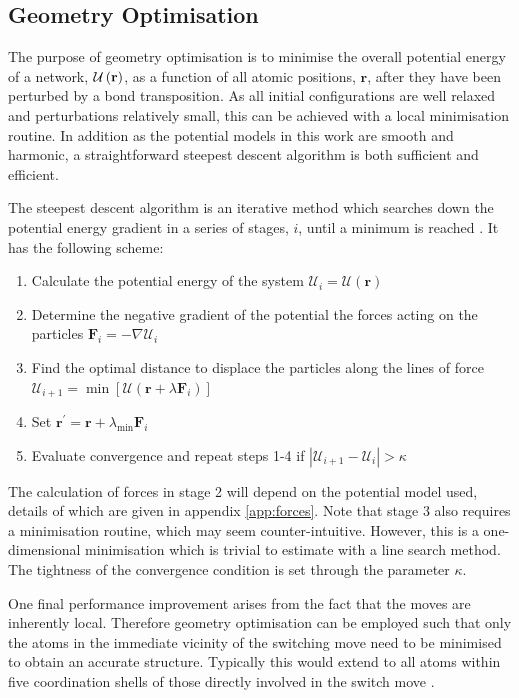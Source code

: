 \subsection{Geometry Optimisation}
\label{s:geomopt}

The purpose of geometry optimisation is to minimise the overall potential energy of a network, $\mathcal{U}\left(\mathbf{r}\right)$, as a function of all atomic positions, $\mathbf{r}$, after they have been perturbed \eg{} by a bond transposition.
As all initial configurations are well relaxed and perturbations relatively small, this can be achieved with a local minimisation routine.
In addition as the potential models in this work are smooth and harmonic, a straightforward steepest descent algorithm is both sufficient and efficient.

The steepest descent algorithm is an iterative method which searches down the potential energy gradient in a series of stages, $i$, until a minimum is reached \cite{Nocedal2006}.
It has the following scheme:
\begin{enumerate}
	\item Calculate the potential energy of the system $\mathcal{U}_i=\mathcal{U}\left(\mathbf{r}\right)$
	\item Determine the negative gradient of the potential \ie{} the forces acting on the particles $\mathbf{F}_i=-\nabla \mathcal{U}_i$ 
	\item Find the optimal distance to displace the particles along the lines of force $\mathcal{U}_{i+1}=\min \left[\mathcal{U}\left(\mathbf{r}+\lambda \mathbf{F}_i\right)\right]$
	\item Set $\mathbf{r}^{\prime}=\mathbf{r}+\lambda_{\text{min}} \mathbf{F}_i$
	\item Evaluate convergence and repeat steps 1-4 if $\left|\mathcal{U}_{i+1}-\mathcal{U}_i\right|>\kappa$
\end{enumerate}
The calculation of forces in stage 2 will depend on the potential model used, details of which are given in appendix \ref{app:forces}.
Note that stage 3 also requires a minimisation routine, which may seem counter\--intuitive. 
However, this is a one\--dimensional minimisation which is trivial to estimate with a line search method.
The tightness of the convergence condition is set through the parameter $\kappa$.

One final performance improvement arises from the fact that the \mc{} moves are inherently local.
Therefore geometry optimisation can be employed such that only the atoms in the immediate vicinity of the switching move need to be minimised to obtain an accurate structure.
Typically this would extend to all atoms within five coordination shells of those directly involved in the switch move \cite{Mousseau2001}.

